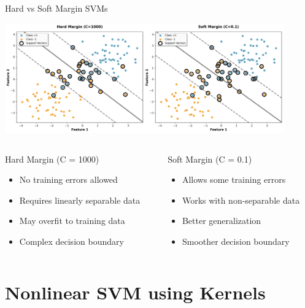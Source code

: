 \documentclass[8pt,aspectratio=1610]{beamer}
\begin{document}
\begin{frame}{Hard vs Soft Margin SVMs}
\begin{center}
\includegraphics[width=0.9\textwidth]{../figures/hard_vs_soft_margin.png}
\end{center}

\begin{columns}[t]
\begin{column}{0.48\textwidth}
\begin{block}{Hard Margin (C = 1000)}
\begin{itemize}
\setlength{\itemsep}{1pt}
\item No training errors allowed
\item Requires linearly separable data
\item May overfit to training data
\item Complex decision boundary
\end{itemize}
\end{block}
\end{column}

\begin{column}{0.48\textwidth}
\begin{block}{Soft Margin (C = 0.1)}
\begin{itemize}
\setlength{\itemsep}{1pt}
\item Allows some training errors
\item Works with non-separable data
\item Better generalization
\item Smoother decision boundary
\end{itemize}
\end{block}
\end{column}
\end{columns}
\end{frame}

\section{Nonlinear SVM using Kernels}
\end{document}
